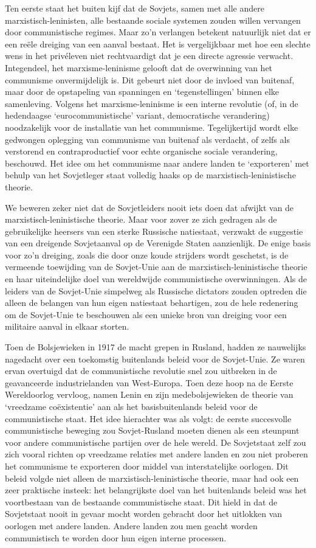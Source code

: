 \documentclass[
  a5paper,
  smalldemyvopaper,10pt,twoside,onecolumn,openright,extrafontsizes,hidelinks]{memoir}
\begin{document}
Ten eerste staat het buiten kijf dat de Sovjets, samen met alle andere
marxistisch-leninisten, alle bestaande sociale systemen zouden willen
vervangen door communistische regimes. Maar zo'n verlangen betekent
natuurlijk niet dat er een reële dreiging van een aanval bestaat. Het is
vergelijkbaar met hoe een slechte wens in het privéleven niet
rechtvaardigt dat je een directe agressie verwacht. Integendeel, het
marxisme-leninisme gelooft dat de overwinning van het communisme
onvermijdelijk is. Dit gebeurt niet door de invloed van buitenaf, maar
door de opstapeling van spanningen en `tegenstellingen' binnen elke
samenleving. Volgens het marxisme-leninisme is een interne revolutie
(of, in de hedendaagse `eurocommunistische' variant, democratische
verandering) noodzakelijk voor de installatie van het communisme.
Tegelijkertijd wordt elke gedwongen oplegging van communisme van
buitenaf als verdacht, of zelfs als verstorend en contraproductief voor
echte organische sociale verandering, beschouwd. Het idee om het
communisme naar andere landen te `exporteren' met behulp van het
Sovjetleger staat volledig haaks op de marxistisch-leninistische
theorie.

We beweren zeker niet dat de Sovjetleiders nooit iets doen dat afwijkt
van de marxistisch-leninistische theorie. Maar voor zover ze zich
gedragen als de gebruikelijke heersers van een sterke Russische
natiestaat, verzwakt de suggestie van een dreigende Sovjetaanval op de
Verenigde Staten aanzienlijk. De enige basis voor zo'n dreiging, zoals
die door onze koude strijders wordt geschetst, is de vermeende
toewijding van de Sovjet-Unie aan de marxistisch-leninistische theorie
en haar uiteindelijke doel van wereldwijde communistische overwinningen.
Als de leiders van de Sovjet-Unie simpelweg als Russische dictators
zouden optreden die alleen de belangen van hun eigen natiestaat
behartigen, zou de hele redenering om de Sovjet-Unie te beschouwen als
een unieke bron van dreiging voor een militaire aanval in elkaar
storten.

Toen de Bolsjewieken in 1917 de macht grepen in Rusland, hadden ze
nauwelijks nagedacht over een toekomstig buitenlands beleid voor de
Sovjet-Unie. Ze waren ervan overtuigd dat de communistische revolutie
snel zou uitbreken in de geavanceerde industrielanden van West-Europa.
Toen deze hoop na de Eerste Wereldoorlog vervloog, namen Lenin en zijn
medebolsjewieken de theorie van `vreedzame coëxistentie' aan als het
basisbuitenlands beleid voor de communistische staat. Het idee
hierachter was als volgt: de eerste succesvolle communistische beweging
zou Sovjet-Rusland moeten dienen als een steunpunt voor andere
communistische partijen over de hele wereld. De Sovjetstaat zelf zou
zich vooral richten op vreedzame relaties met andere landen en zou niet
proberen het communisme te exporteren door middel van interstatelijke
oorlogen. Dit beleid volgde niet alleen de marxistisch-leninistische
theorie, maar had ook een zeer praktische insteek: het belangrijkste
doel van het buitenlands beleid was het voortbestaan van de bestaande
communistische staat. Dit hield in dat de Sovjetstaat nooit in gevaar
mocht worden gebracht door het uitlokken van oorlogen met andere landen.
Andere landen zou men geacht worden communistisch te worden door hun
eigen interne processen.
\end{document}
